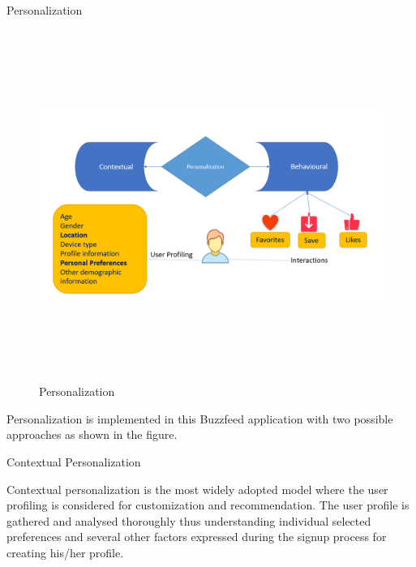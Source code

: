 \begin{enumerate}

    {\bf \large \item   Personalization }
    \begin{center}
  \begin{figure}[h!]
   \includegraphics[scale=0.7,width=7in,height=4.5in]{images/personalization.png}
    \caption{Personalization}
    \end{figure}
    \end{center}
    
    Personalization is implemented in this Buzzfeed  application with two possible approaches as shown in the figure.
    \begin{enumerate}
    {\bf  \item \large Contextual Personalization} \newline
  \hspace*{1cm} Contextual personalization is the most widely adopted model where the user profiling is considered for customization and recommendation.
  The user profile is gathered and analysed thoroughly thus understanding individual selected preferences and several other factors expressed during the signup process for creating his/her profile.
  

\end{enumerate}
\end{enumerate}

